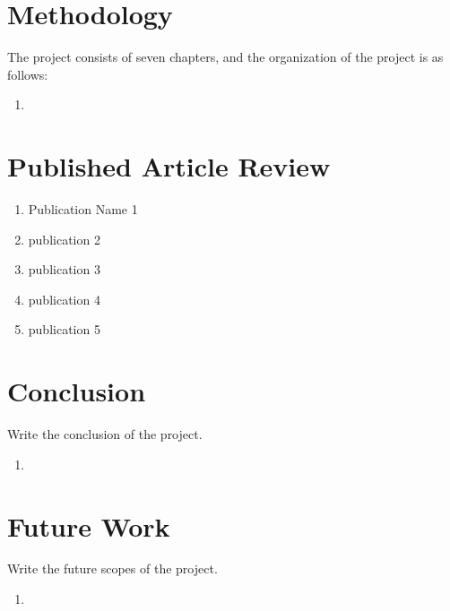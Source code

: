 \documentclass[12pt,a4paper,oneside]{report}
\begin{document}
	\newpage
	\section{Methodology}
	The project consists  of seven  chapters, and the organization of the project is as follows:
	\begin{enumerate}
		\item 
		
	\end{enumerate}
	
	\newpage
	\section{Published Article Review}
	\begin{enumerate}
		\item Publication Name 1  
		\item publication 2
		\item publication 3
		\item publication 4
		\item publication 5
		
	\end{enumerate}
	
	\newpage
	\section{Conclusion}
	Write the conclusion of the project.
	\begin{enumerate}
		\item 
	\end{enumerate}
	
	\newpage
	\section{Future Work}
	Write the future scopes of the project.
	\begin{enumerate}
		\item 
		
	\end{enumerate}
	
	
	
\end{document}
